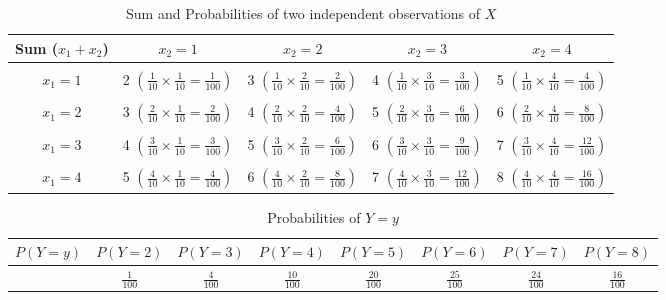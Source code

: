\begin{subquestions}
\begin{subsubquestions}
\begin{table}[H]
	\small
	\centering
	\begin{tabular}{|c|c|c|c|c|}
		\hline
		 Sum ($x_1+x_2$) & $x_2=1$ & $x_2=2$ & $x_2=3$ & $x_2=4$ \\
		\hline 
		& & & &\\
		$x_1=1$ & 2 $\left(\frac{1}{10} \times \frac{1}{10}=\frac{1}{100}\right)$ & 3 $\left(\frac{1}{10} \times \frac{2}{10}=\frac{2}{100}\right)$ & 4 $\left(\frac{1}{10} \times \frac{3}{10}=\frac{3}{100}\right)$ & 5 $\left(\frac{1}{10} \times \frac{4}{10}=\frac{4}{100}\right)$ \\ & & & & \\
		
		$x_1=2$ & 3 $\left(\frac{2}{10} \times \frac{1}{10}=\frac{2}{100}\right)$ & 4 $\left(\frac{2}{10} \times \frac{2}{10}=\frac{4}{100}\right)$ & 5 $\left(\frac{2}{10} \times \frac{3}{10}=\frac{6}{100}\right)$ & 6 $\left(\frac{2}{10} \times \frac{4}{10}=\frac{8}{100}\right)$ \\ & & & & \\
		
		$x_1=3$ & 4 $\left(\frac{3}{10} \times \frac{1}{10}=\frac{3}{100}\right)$ & 5 $\left(\frac{3}{10} \times \frac{2}{10}=\frac{6}{100}\right)$ & 6 $\left(\frac{3}{10} \times \frac{3}{10}=\frac{9}{100}\right)$ & 7 $\left(\frac{3}{10} \times \frac{4}{10}=\frac{12}{100}\right)$ \\ & & & & \\
		
		$x_1=4$ & 5 $\left(\frac{4}{10} \times \frac{1}{10}=\frac{4}{100}\right)$ & 6 $\left(\frac{4}{10} \times \frac{2}{10}=\frac{8}{100}\right)$ & 7 $\left(\frac{4}{10} \times \frac{3}{10}=\frac{12}{100}\right)$ & 8 $\left(\frac{4}{10} \times \frac{4}{10}=\frac{16}{100}\right)$ \\
		\hline
	\end{tabular}
	\caption{\label{2008J:q4:Ytab} Sum and Probabilities of two independent observations of $X$}	
\end{table}


\begin{table}[H]
	\small
	\centering
	\begin{tabular}{|c|c|c|c|c|c|c|c|}
		\hline
		$P(Y=y)$ & $P(Y=2)$ &$P(Y=3)$ &$P(Y=4)$ &$P(Y=5)$ &$P(Y=6)$ &$P(Y=7)$ &$P(Y=8)$ \\
		\hline 
		 & $\frac{1}{100}$  &
		 $\frac{4}{100}$  &
		 $\frac{10}{100}$ & 
		 $\frac{20}{100}$  &
		 $\frac{25}{100}$   &
		 $\frac{24}{100}$  &
		$\frac{16}{100}$  \\
		\hline
	\end{tabular}
	\caption{\label{2008J:q4:Ytab2} Probabilities of $Y=y$}	
\end{table}


\end{subsubquestions}
\end{subquestions}
